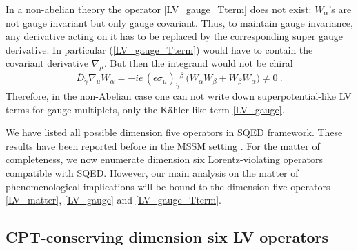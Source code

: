 \documentclass[12pt]{revtex4}
\begin{document}
In a non-abelian theory the operator 
\eqref{LV_gauge_Tterm} does not exist:
$W_\alpha$'s are not gauge invariant but only gauge covariant.
Thus, to maintain gauge invariance, any derivative acting on it has to
be replaced by the corresponding super gauge derivative. 
In particular
 (\ref{LV_gauge_Tterm}) would have to contain the covariant
derivative $\nabla_\mu$.  But then the integrand would not be chiral 
\begin{equation}
\overline{D}_{\dot\gamma} \nabla_\mu W_\alpha = 
-i e\, (\epsilon \bar\sigma_\mu)_{\dot\gamma}{}^\beta\, 
\Big( W_\alpha W_\beta + W_\beta W_\alpha \Big) \neq 0~. 
\end{equation} 
Therefore, in the non-Abelian case one can not write down
superpotential-like LV terms for gauge multiplets, only 
the K\"ahler-like term \eqref{LV_gauge}. 

We have listed all possible dimension five operators in SQED framework.
These results have been reported before in the MSSM 
setting \cite{GrootNibbelink:2004za}.
For the matter of completeness, we now enumerate dimension six Lorentz-violating 
operators compatible with SQED. 
However, our main analysis on the matter
of phenomenological implications will be bound to the dimension five
operators
\eqref{LV_matter}, \eqref{LV_gauge} and \eqref{LV_gauge_Tterm}.


\subsection{CPT-conserving dimension six LV operators}
\label{Dim6}


\end{document}
